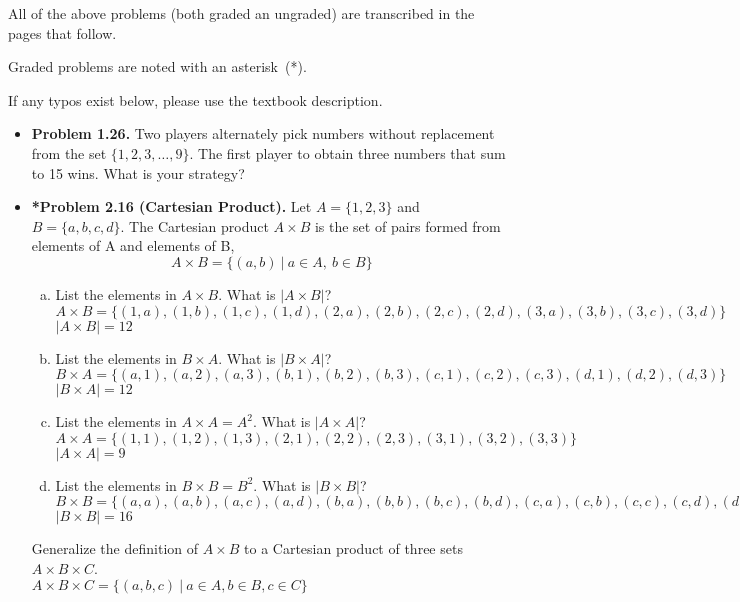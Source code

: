 \documentclass[11pt]{article}
\begin{document}
All of the above problems (both graded an ungraded)
are transcribed in the pages that follow.

Graded problems are noted with an asterisk~(*).

If any typos exist below, please use the textbook description.

\newpage
\begin{itemize}

\item \textbf{Problem 1.26.}
  Two players alternately pick numbers without replacement
  from the set $\{1,2,3,\ldots,9\}$.
  The first player to obtain three numbers that sum to 15 wins.
  What is your strategy?

\vspace{0.1in}

\item \textbf{*Problem 2.16 (Cartesian Product).}
  Let $A=\{1,2,3\}$ and $B=\{a,b,c,d\}$.
  The Cartesian product $A\times B$ is the set of pairs formed
  from elements of A and elements of B,
  $$A\times B = \{(a,b)\ |\ a\in A,\ b\in B\}$$

  \begin{enumerate}[(a)]
  \item List the elements in $A\times B$.
    What is $|A\times B|$?
\\$A\times B=\{(1,a),(1,b),(1,c),(1,d),(2,a),(2,b),(2,c),(2,d),(3,a),(3,b),(3,c),(3,d)\}$
\\$|A\times B|=12$
  \item List the elements in $B\times A$.
    What is $|B\times A|$?
\\$B\times A=\{(a,1),(a,2),(a,3),(b,1),(b,2),(b,3),(c,1),(c,2),(c,3),(d,1),(d,2),(d,3)\}$
\\$|B\times A|=12$
  \item List the elements in $A\times A=A^2$.
    What is $|A\times A|$?
\\$A\times A=\{(1,1),(1,2),(1,3),(2,1),(2,2),(2,3),(3,1),(3,2),(3,3)\}$
\\$|A\times A|=9$
  \item List the elements in $B\times B=B^2$.
    What is $|B\times B|$?
\\ \hphantom{0} \hspace{-0.75in}$B\times B=\{(a,a),(a,b),(a,c),(a,d),(b,a),(b,b),(b,c),(b,d),(c,a),(c,b),(c,c),(c,d),(d,a),(d,b),(d,c),(d,d)\}$
\\$|B\times B|=16$
  \end{enumerate}

  Generalize the definition of $A\times B$ to a Cartesian product
  of three sets $A\times B\times C$.
\\$A\times B\times C = \{(a,b,c)\ |\ a\in A, b\in B, c\in C\}$


\end{itemize}
\end{document}
